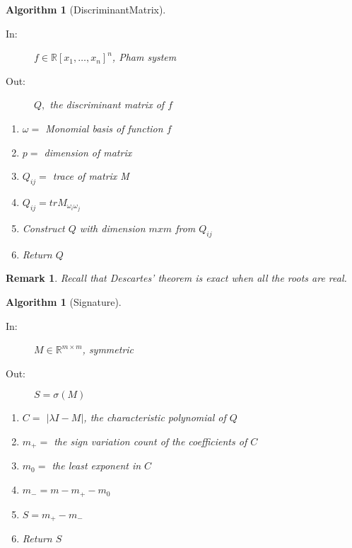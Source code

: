 \documentclass{article}%
\newtheorem{algorithm}[theorem]{Algorithm}
\newtheorem{remark}[theorem]{Remark}
\begin{document}
\begin{algorithm}[DiscriminantMatrix]\ 

\begin{description}
\item[In:] $f\in\mathbb{R}\left[  x_{1},\ldots,x_{n}\right]^{n}$, Pham system

\item[Out:] $Q,$ the discriminant matrix of $f$
\end{description}
\begin{enumerate}
\item $\omega = $ Monomial basis of function $f$
\item $p = $ dimension of matrix
\item $Q_{ij} = $ trace of matrix M
\item $Q_{ij} = tr M_{\omega_i \omega_j}$
\item Construct $Q$ with dimension $m x m$ from $Q_{ij}$
\item Return $Q$
\end{enumerate}
\end{algorithm}

\begin{remark}
Recall that Descartes' theorem is exact when all the roots are real.
\end{remark}

\begin{algorithm}[Signature]\ 

\begin{description}
\item[In:] $M\in\mathbb{R}^{m\times m}$, symmetric

\item[Out:] $S=\sigma(M)$
\end{description}

\begin{enumerate}
\item $C=$ $\left\vert \lambda I-M\right\vert $, the characteristic polynomial of $Q$

\item $m_{+}=$ the sign variation count of the coefficients of $C$

\item $m_{0}=$ the least exponent in $C$

\item $m_{-}=m-m_{+}-m_{0}$

\item $S=m_{+}-m_{-}$

\item Return $S$
\end{enumerate}
\end{algorithm}
\end{document}
